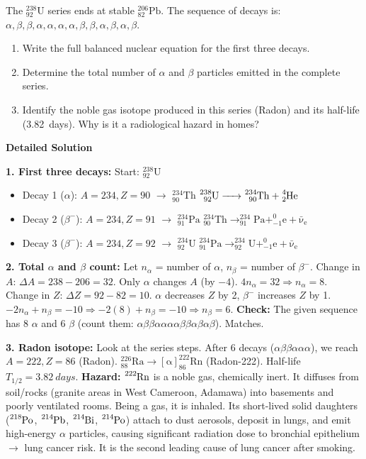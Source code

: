 \documentclass[11pt]{article}
\begin{document}
\begin{exoresolu}
The $\ensuremath{\mathrm{^{238}_{92}U}}$ series ends at stable $\ensuremath{\mathrm{^{206}_{82}Pb}}$. The sequence of decays is: $\alpha, \beta, \beta, \alpha, \alpha, \alpha, \alpha, \beta, \beta, \alpha, \beta, \alpha, \beta$.
\begin{enumerate}
\item Write the full balanced nuclear equation for the first three decays.
\item Determine the total number of $\alpha$ and $\beta$ particles emitted in the complete series.
\item Identify the noble gas isotope produced in this series (Radon) and its half-life (\SI{3.82}{days}). Why is it a radiological hazard in homes?
\end{enumerate}
\tcblower
\textbf{Detailed Solution}

\textbf{1. First three decays:}
Start: $\ensuremath{\mathrm{^{238}_{92}U}}$
\begin{itemize}
\item Decay 1 ($\alpha$): $A=234, Z=90$ $\to$ $\ensuremath{\mathrm{^{234}_{90}Th}}$
$\ce{^{238}_{92}U -> ^{234}_{90}Th + ^{4}_{2}He}$
\item Decay 2 ($\beta^-$): $A=234, Z=91$ $\to$ $\ensuremath{\mathrm{^{234}_{91}Pa}}$
$\ensuremath{\mathrm{^{234}_{90}Th \rightarrow  ^{234}_{91}Pa + ^{0}_{-1}e + \bar{\nu}_e}}$
\item Decay 3 ($\beta^-$): $A=234, Z=92$ $\to$ $\ensuremath{\mathrm{^{234}_{92}U}}$
$\ensuremath{\mathrm{^{234}_{91}Pa \rightarrow  ^{234}_{92}U + ^{0}_{-1}e + \bar{\nu}_e}}$
\end{itemize}

\textbf{2. Total $\alpha$ and $\beta$ count:}
Let $n_\alpha$ = number of $\alpha$, $n_\beta$ = number of $\beta^-$.
Change in $A$: $\Delta A = 238 - 206 = 32$. Only $\alpha$ changes $A$ (by $-4$).
$4 n_\alpha = 32 \Rightarrow n_\alpha = 8$.
Change in $Z$: $\Delta Z = 92 - 82 = 10$. $\alpha$ decreases $Z$ by 2, $\beta^-$ increases $Z$ by 1.
$-2 n_\alpha + n_\beta = -10 \Rightarrow -2(8) + n_\beta = -10 \Rightarrow n_\beta = 6$.
\textbf{Check:} The given sequence has 8 $\alpha$ and 6 $\beta$ (count them: $\alpha\beta\beta\alpha\alpha\alpha\alpha\beta\beta\alpha\beta\alpha\beta$). Matches.

\textbf{3. Radon isotope:}
Look at the series steps. After 6 decays ($\alpha\beta\beta\alpha\alpha\alpha$), we reach $A=222, Z=86$ (Radon).
$\ensuremath{\mathrm{^{226}_{88}Ra \rightarrow [\alpha] ^{222}_{86}Rn}}$ (Radon-222).
Half-life $T_{1/2} = \SI{3.82}{days}$.
\textbf{Hazard:} $\ce{^{222}Rn}$ is a noble gas, chemically inert. It diffuses from soil/rocks (granite areas in West Cameroon, Adamawa) into basements and poorly ventilated rooms. Being a gas, it is inhaled. Its short-lived solid daughters ($\ce{^{218}Po}$, $\ce{^{214}Pb}$, $\ce{^{214}Bi}$, $\ce{^{214}Po}$) attach to dust aerosols, deposit in lungs, and emit high-energy $\alpha$ particles, causing significant radiation dose to bronchial epithelium $\to$ lung cancer risk. It is the second leading cause of lung cancer after smoking.
\end{exoresolu}
\end{document}
